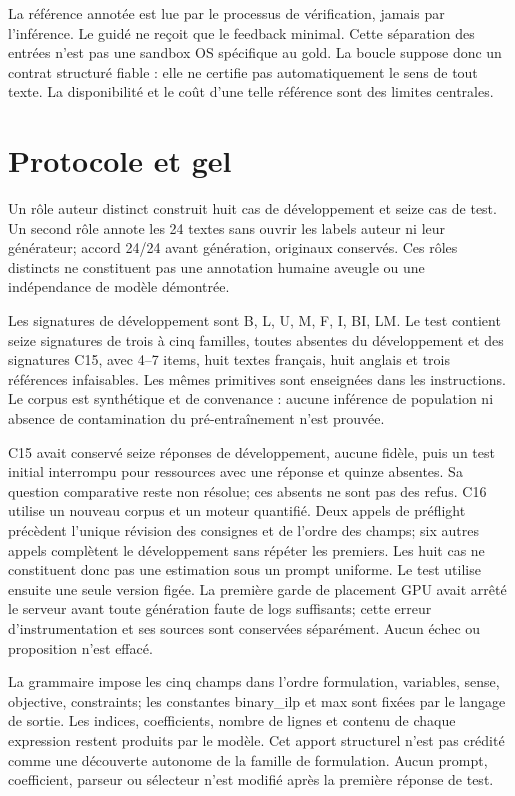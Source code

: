 \documentclass[11pt]{article}
\begin{document}
La référence annotée est lue par le processus de vérification, jamais par l'inférence. Le guidé ne reçoit que le feedback minimal. Cette séparation des entrées n'est pas une sandbox OS spécifique au gold. La boucle suppose donc un contrat structuré fiable : elle ne certifie pas automatiquement le sens de tout texte. La disponibilité et le coût d'une telle référence sont des limites centrales.

\section{Protocole et gel}

Un rôle auteur distinct construit huit cas de développement et seize cas de test. Un second rôle annote les 24 textes sans ouvrir les labels auteur ni leur générateur; accord 24/24 avant génération, originaux conservés. Ces rôles distincts ne constituent pas une annotation humaine aveugle ou une indépendance de modèle démontrée.

Les signatures de développement sont B, L, U, M, F, I, BI, LM. Le test contient seize signatures de trois à cinq familles, toutes absentes du développement et des signatures C15, avec 4–7 items, huit textes français, huit anglais et trois références infaisables. Les mêmes primitives sont enseignées dans les instructions. Le corpus est synthétique et de convenance : aucune inférence de population ni absence de contamination du pré-entraînement n'est prouvée.

C15 avait conservé seize réponses de développement, aucune fidèle, puis un test initial interrompu pour ressources avec une réponse et quinze absentes. Sa question comparative reste non résolue; ces absents ne sont pas des refus. C16 utilise un nouveau corpus et un moteur quantifié. Deux appels de préflight précèdent l'unique révision des consignes et de l'ordre des champs; six autres appels complètent le développement sans répéter les premiers. Les huit cas ne constituent donc pas une estimation sous un prompt uniforme. Le test utilise ensuite une seule version figée. La première garde de placement GPU avait arrêté le serveur avant toute génération faute de logs suffisants; cette erreur d'instrumentation et ses sources sont conservées séparément. Aucun échec ou proposition n'est effacé.

La grammaire impose les cinq champs dans l'ordre formulation, variables, sense, objective, constraints; les constantes binary\_ilp et max sont fixées par le langage de sortie. Les indices, coefficients, nombre de lignes et contenu de chaque expression restent produits par le modèle. Cet apport structurel n'est pas crédité comme une découverte autonome de la famille de formulation. Aucun prompt, coefficient, parseur ou sélecteur n'est modifié après la première réponse de test.
\end{document}
